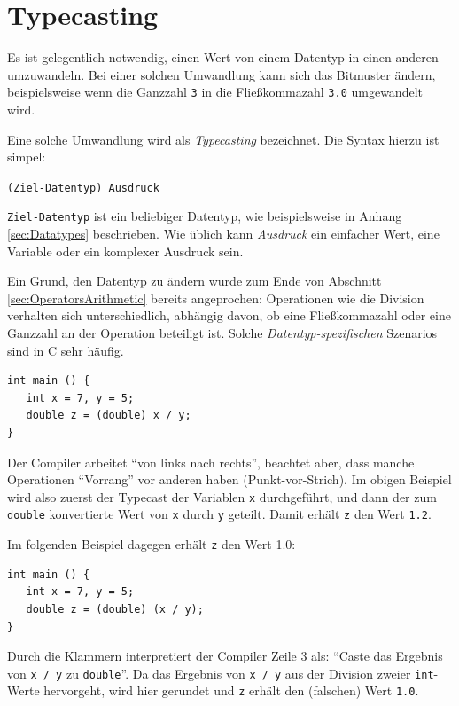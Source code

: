 \section{Typecasting} \label{sec:Casting}
Es ist gelegentlich notwendig, einen Wert von einem Datentyp in einen anderen umzuwandeln. Bei einer solchen Umwandlung kann sich das Bitmuster ändern, beispielsweise wenn die Ganzzahl \texttt{3} in die Fließkommazahl \texttt{3.0} umgewandelt wird.

Eine solche Umwandlung wird als \emph{Typecasting} bezeichnet. Die Syntax hierzu ist simpel:
\begin{codebox}
\texttt{(Ziel-Datentyp) Ausdruck}
\end{codebox}
\texttt{Ziel-Datentyp} ist ein beliebiger Datentyp, wie beispielsweise in Anhang \ref{sec:Datatypes} beschrieben. Wie üblich kann \emph{Ausdruck} ein einfacher Wert, eine Variable oder ein komplexer Ausdruck sein.

Ein Grund, den Datentyp zu ändern wurde zum Ende von Abschnitt \ref{sec:OperatorsArithmetic} bereits angeprochen: Operationen wie die Division verhalten sich unterschiedlich, abhängig davon, ob eine Fließkommazahl oder eine Ganzzahl an der Operation beteiligt ist. Solche \emph{Datentyp-spezifischen} Szenarios sind in C sehr häufig.

\begin{codebox}
\begin{verbatim}
int main () {
   int x = 7, y = 5;
   double z = (double) x / y;
}
\end{verbatim}
\end{codebox}

\begin{hintbox}
Der Compiler arbeitet \enquote{von links nach rechts}, beachtet aber, dass manche Operationen \enquote{Vorrang} vor anderen haben (\eg Punkt-vor-Strich). Im obigen Beispiel wird also zuerst der Typecast der Variablen \texttt{x} durchgeführt, und dann der zum \texttt{double} konvertierte Wert von \texttt{x} durch \texttt{y} geteilt. Damit erhält \texttt{z} den Wert \texttt{1.2}.

Im folgenden Beispiel dagegen erhält \texttt{z} den Wert 1.0:
\begin{codebox}
\begin{verbatim}
int main () {
   int x = 7, y = 5;
   double z = (double) (x / y);
}
\end{verbatim}
\end{codebox}
Durch die Klammern interpretiert der Compiler Zeile 3 als: \enquote{Caste das Ergebnis von \texttt{x / y} zu \texttt{double}}. Da das Ergebnis von \texttt{x / y} aus der Division zweier \texttt{int}-Werte hervorgeht, wird hier gerundet und \texttt{z} erhält den (\idR falschen) Wert \texttt{1.0}.
\end{hintbox}

